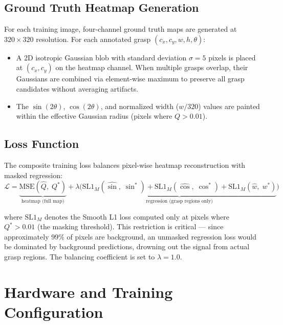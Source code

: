 \documentclass[12pt, a4paper]{article}
\begin{document}
\subsection{Ground Truth Heatmap Generation}

For each training image, four-channel ground truth maps are generated at $320 \times 320$ resolution. For each annotated grasp $(c_x, c_y, w, h, \theta)$:

\begin{itemize}[leftmargin=2em]
    \item A 2D isotropic Gaussian blob with standard deviation $\sigma = 5$ pixels is placed at $(c_x, c_y)$ on the heatmap channel. When multiple grasps overlap, their Gaussians are combined via element-wise maximum to preserve all grasp candidates without averaging artifacts.
    \item The $\sin(2\theta)$, $\cos(2\theta)$, and normalized width ($w / 320$) values are painted within the effective Gaussian radius (pixels where $Q > 0.01$).
\end{itemize}

\subsection{Loss Function}

The composite training loss balances pixel-wise heatmap reconstruction with masked regression:
\begin{equation}
    \mathcal{L} = \underbrace{\text{MSE}(\hat{Q},\; Q^*)}_{\text{heatmap (full map)}} + \lambda \Big( \underbrace{\text{SL1}_M(\widehat{\sin},\; \sin^*) + \text{SL1}_M(\widehat{\cos},\; \cos^*) + \text{SL1}_M(\hat{w},\; w^*)}_{\text{regression (grasp regions only)}} \Big)
\end{equation}

where $\text{SL1}_M$ denotes the Smooth L1 loss computed only at pixels where $Q^* > 0.01$ (the masking threshold). This restriction is critical — since approximately 99\% of pixels are background, an unmasked regression loss would be dominated by background predictions, drowning out the signal from actual grasp regions. The balancing coefficient is set to $\lambda = 1.0$.

\section{Hardware and Training Configuration}
\label{sec:training}
\end{document}
